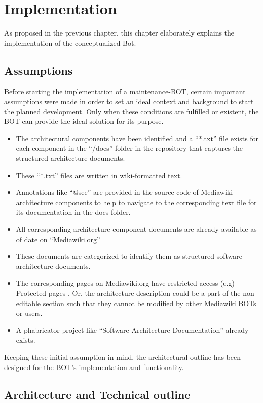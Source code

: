\chapter{Implementation}\label{chapter:Implementation}
\indent As proposed in the previous chapter, this chapter elaborately explains the implementation of the conceptualized Bot. 
\section{Assumptions}

\indent Before starting the implementation of a maintenance-BOT, certain important assumptions were made in order to set an ideal context and background to start the planned development. Only when these conditions are fulfilled or existent, the BOT can provide the ideal solution for its purpose.
\begin{itemize}
\item The architectural components have been identified and a \enquote{*.txt} file exists for each component in the \enquote{/docs} folder in the repository that captures the structured architecture documents.
\item These \enquote{*.txt} files are written in wiki-formatted text.
\item Annotations like \enquote{@see} are provided in the source code of Mediawiki architecture components to help to navigate to the corresponding text file for its documentation in the docs folder.
\item All corresponding architecture component documents are already available as of date on \enquote{Mediawiki.org}
\item These documents are categorized to identify them as structured software architecture documents.
\item The corresponding pages on Mediawiki.org have restricted access (e.g) Protected pages \cite{help_pp}. Or, the architecture description could be a part of the non-editable section such that they cannot be modified by other Mediawiki BOTs or users.
\item A phabricator project like \enquote{Software Architecture Documentation} already exists.
\end{itemize}

Keeping these initial assumption in mind, the architectural outline has been designed for the BOT's implementation and functionality. 

\section{Architecture and Technical outline}

